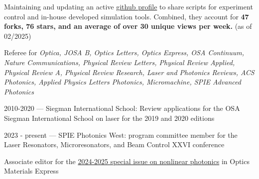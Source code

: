 \documentclass[11pt, a4paper]{customcv}
\begin{document}
%
{
    {
      \begin{cvitems} %
            \item Maintaining and updating an active \href{https://github.com/gregmoille}{github profile} to share scripts for experiment control and in-house developed simulation tools. Combined, they account for \textbf{47 forks, 76 stars, and an average of over 30 unique views per week.} (as of 02/2025)
      \end{cvitems}
    }
    \vspace{1ex}
    {
      \begin{cvitems} %
            \item Referee for \textit{Optica, JOSA B, Optics Letters, Optics Express, OSA Continuum, Nature Communications, Physical Review Letters, Physical Review Applied, Physical Review A, Physical Review Research, Laser and Photonics Reviews, ACS Photonics, Applied Physics Letters Photonics, Micromachine, SPIE Advanced Photonics}
      \end{cvitems}
    }
    \vspace{1ex}
    {
      \begin{cvitems} %
            \item {2010-2020 --- Siegman International School: Review applications for the OSA Siegman International School on laser for the 2019 and 2020 editions}
            \item {2023 - present --- SPIE Photonics West: program committee member for the Laser Resonators, Microresonators, and Beam Control XXVI conference}
            \item Associate editor for the \href{https://opg.optica.org/ome/virtual_issue.cfm?vid=623}{2024-2025 special issue on nonlinear photonics} in Optics Materials Express
      \end{cvitems}
    }
}
\end{document}
